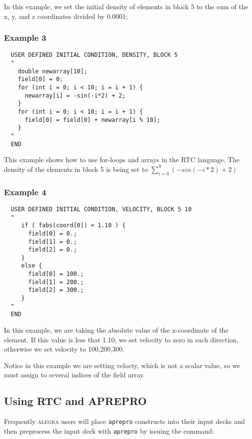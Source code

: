\noindent In this example, we set the initial density of elements in
block 5 to the sum of the x, y, and z coordinates divided by 0.0001;

\subsubsection*{Example 3}

{\ttfamily \begin{verbatim}
  USER DEFINED INITIAL CONDITION, DENSITY, BLOCK 5
  "
    double newarray[10];
    field[0] = 0;
    for (int i = 0; i < 10; i = i + 1) {
      newarray[i] = -sin(-i*2) + 2;
    }
    for (int i = 0; i < 10; i = i + 1) {
      field[0] = field[0] + newarray[i % 10];
    }
  "
  END
\end{verbatim} }

\noindent This example shows how to use for-loops and arrays in the
RTC language. The density of the elements in block 5 is being set to
$\sum_{i=0}^9 (-sin(-i*2) + 2)$

\subsubsection*{Example 4}

{\ttfamily \begin{verbatim}
  USER DEFINED INITIAL CONDITION, VELOCITY, BLOCK 5 10
  "
     if ( fabs(coord[0]) < 1.10 ) {
       field[0] = 0.;
       field[1] = 0.;
       field[2] = 0.;
     }
     else {
       field[0] = 100.;
       field[1] = 200.;
       field[2] = 300.;
     }
  "
  END
\end{verbatim} }

\noindent In this example, we are taking the absolute value of the
x-coordinate of the element. If this value is less that 1.10, we set
velocity to zero in each direction, otherwise we set velocity to
100,200,300.

\noindent Notice in this example we are setting velocty, which is not
a scalar value, so we must assign to several indices of the field
array.

\subsection{Using RTC and APREPRO}

Frequently \textsc{alegra} users will place \texttt{aprepro} constructs into
their input decks and then preprocess the input deck with \texttt{aprepro} by
issuing the command:

